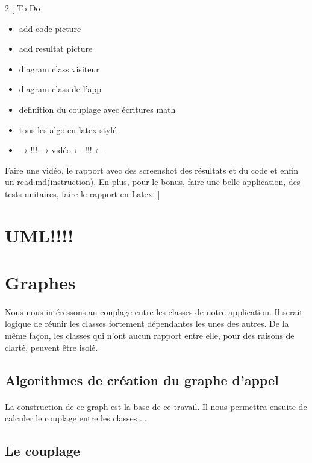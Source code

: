 \documentclass[a4paper]{article}
\begin{document}
    \newpage
    \begin{multicols}{2}
        [
            To Do
            \begin{itemize}
                \item add code picture 
                \item add resultat picture
                \item diagram class visiteur
                \item diagram class de l'app
                \item definition du couplage avec écritures math
                \item tous les algo en latex stylé
                \item → !!! → vidéo ← !!! ← 
            \end{itemize}
            Faire une vidéo, le rapport avec des screenshot des résultats et du code et enfin un read.md(instruction). En plus, pour le bonus, faire une belle application, des tests unitaires, faire le rapport en Latex.
        ]
        \section{UML!!!!}

        \section{Graphes}
        \paragraph{} 
        Nous nous intéressons au couplage entre les classes de notre application. Il serait logique de réunir les classes fortement dépendantes les unes des autres. De la même façon, les classes qui n'ont aucun rapport entre elle, pour des raisons de clarté, peuvent être isolé.
        \subsection{Algorithmes de création du graphe d'appel}
        \paragraph{} La construction de ce graph est la base de ce travail. Il nous permettra ensuite de calculer le couplage entre les classes ...
        \subsection{Le couplage}

\end{multicols}
\end{document}
